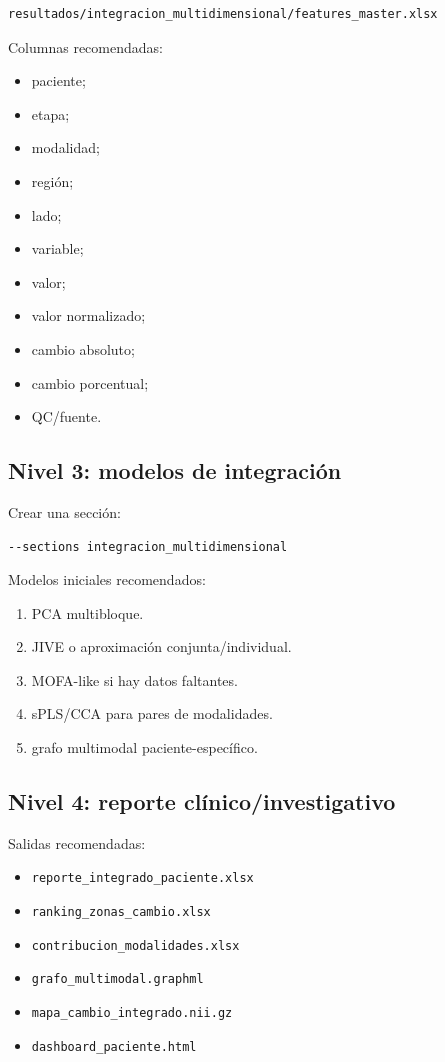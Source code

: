 \documentclass[conference]{IEEEtran}
\begin{document}
\begin{verbatim}
resultados/integracion_multidimensional/features_master.xlsx
\end{verbatim}

Columnas recomendadas:

\begin{itemize}[leftmargin=*]
    \item paciente;
    \item etapa;
    \item modalidad;
    \item región;
    \item lado;
    \item variable;
    \item valor;
    \item valor normalizado;
    \item cambio absoluto;
    \item cambio porcentual;
    \item QC/fuente.
\end{itemize}

\subsection{Nivel 3: modelos de integración}
Crear una sección:

\begin{verbatim}
--sections integracion_multidimensional
\end{verbatim}

Modelos iniciales recomendados:

\begin{enumerate}[leftmargin=*]
    \item PCA multibloque.
    \item JIVE o aproximación conjunta/individual.
    \item MOFA-like si hay datos faltantes.
    \item sPLS/CCA para pares de modalidades.
    \item grafo multimodal paciente-específico.
\end{enumerate}

\subsection{Nivel 4: reporte clínico/investigativo}
Salidas recomendadas:

\begin{itemize}[leftmargin=*]
    \item \texttt{reporte\_integrado\_paciente.xlsx}
    \item \texttt{ranking\_zonas\_cambio.xlsx}
    \item \texttt{contribucion\_modalidades.xlsx}
    \item \texttt{grafo\_multimodal.graphml}
    \item \texttt{mapa\_cambio\_integrado.nii.gz}
    \item \texttt{dashboard\_paciente.html}
\end{itemize}
\end{document}
